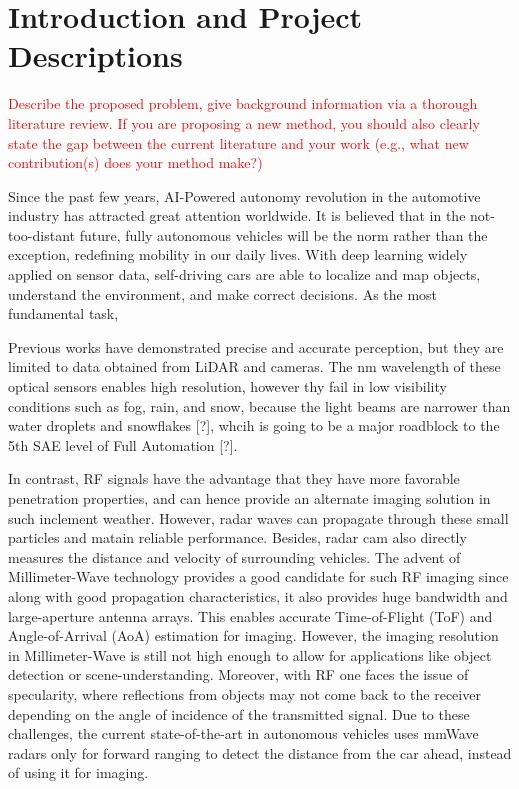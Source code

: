 \section{Introduction and Project Descriptions}
\textcolor{red}{
Describe the proposed problem, give background information via a thorough literature review. If you are proposing a new method, you should also clearly state the gap between the current literature and your work (e.g., what new contribution(s) does your method make?)}

Since the past few years, AI-Powered autonomy revolution in the automotive industry has attracted great attention worldwide. It is believed that in the not-too-distant future, fully
autonomous vehicles will be the norm rather than the exception, redefining mobility in our daily lives. With deep learning widely applied on sensor data, self-driving cars are able to localize and map objects, understand the environment, and make correct decisions. As the most fundamental task, 

Previous works have demonstrated precise and accurate perception, but they are limited to data obtained from LiDAR and cameras. The nm wavelength of these optical sensors enables high resolution, however thy fail in low visibility conditions such as fog, rain, and snow, because the light beams are narrower than water droplets and snowflakes [?], whcih is going to be a major roadblock to the 5th SAE level of Full Automation [?]. 

In contrast, RF signals have the advantage that they have more favorable penetration properties, and can hence provide an alternate imaging solution in such inclement weather. 
However, radar waves can propagate through these small particles and matain reliable performance. Besides, radar cam also directly measures the distance and velocity of surrounding vehicles.
The advent of Millimeter-Wave technology provides a good candidate for such RF imaging since along with good propagation characteristics, it also provides huge bandwidth and large-aperture antenna arrays. This enables accurate Time-of-Flight (ToF) and Angle-of-Arrival (AoA) estimation for imaging. However, the imaging resolution in Millimeter-Wave is still not high enough to allow for applications like object detection or scene-understanding. Moreover, with RF one faces the issue of specularity, where reflections from objects may not come back to the receiver depending on the angle of incidence of the transmitted signal. Due to these challenges, the current state-of-the-art in autonomous vehicles uses mmWave radars only for forward ranging to detect the distance from the car ahead, instead of using it for imaging. 

